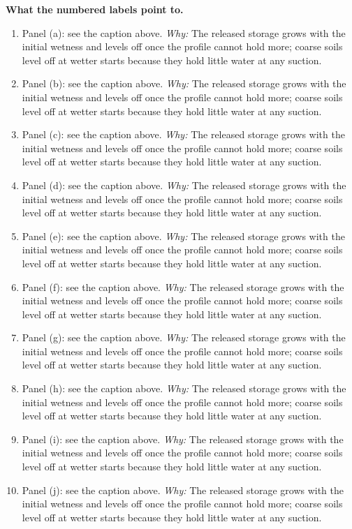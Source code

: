 \textbf{What the numbered labels point to.}
\begin{enumerate}[nosep,label=\protect\circled{\arabic*}]
\item Panel (a): see the caption above. \emph{Why:} The released storage grows with the initial wetness and levels off once the profile cannot hold more; coarse soils level off at wetter starts because they hold little water at any suction.
\item Panel (b): see the caption above. \emph{Why:} The released storage grows with the initial wetness and levels off once the profile cannot hold more; coarse soils level off at wetter starts because they hold little water at any suction.
\item Panel (c): see the caption above. \emph{Why:} The released storage grows with the initial wetness and levels off once the profile cannot hold more; coarse soils level off at wetter starts because they hold little water at any suction.
\item Panel (d): see the caption above. \emph{Why:} The released storage grows with the initial wetness and levels off once the profile cannot hold more; coarse soils level off at wetter starts because they hold little water at any suction.
\item Panel (e): see the caption above. \emph{Why:} The released storage grows with the initial wetness and levels off once the profile cannot hold more; coarse soils level off at wetter starts because they hold little water at any suction.
\item Panel (f): see the caption above. \emph{Why:} The released storage grows with the initial wetness and levels off once the profile cannot hold more; coarse soils level off at wetter starts because they hold little water at any suction.
\item Panel (g): see the caption above. \emph{Why:} The released storage grows with the initial wetness and levels off once the profile cannot hold more; coarse soils level off at wetter starts because they hold little water at any suction.
\item Panel (h): see the caption above. \emph{Why:} The released storage grows with the initial wetness and levels off once the profile cannot hold more; coarse soils level off at wetter starts because they hold little water at any suction.
\item Panel (i): see the caption above. \emph{Why:} The released storage grows with the initial wetness and levels off once the profile cannot hold more; coarse soils level off at wetter starts because they hold little water at any suction.
\item Panel (j): see the caption above. \emph{Why:} The released storage grows with the initial wetness and levels off once the profile cannot hold more; coarse soils level off at wetter starts because they hold little water at any suction.
\end{enumerate}

